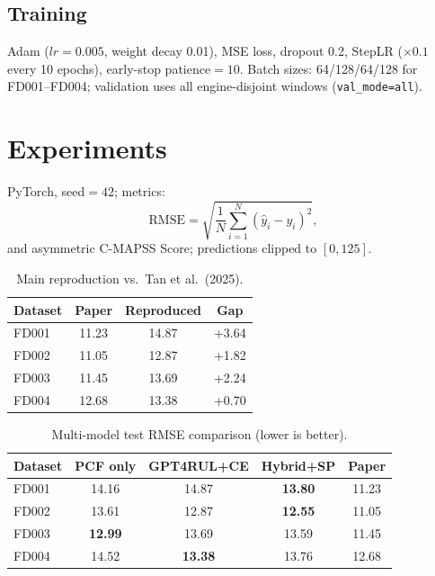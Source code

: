 \documentclass[10pt,twocolumn]{article}
\begin{document}
\subsection{Training}

Adam ($lr{=}0.005$, weight decay 0.01), MSE loss, dropout 0.2, StepLR ($\times 0.1$ every 10 epochs), early-stop patience${=}10$.
Batch sizes: 64/128/64/128 for FD001--FD004; validation uses all engine-disjoint windows (\texttt{val\_mode=all}).

\section{Experiments}

PyTorch, seed${=}42$; metrics:
\begin{equation}
  \mathrm{RMSE} = \sqrt{\frac{1}{N}\sum_{i=1}^{N}(\hat{y}_i - y_i)^2},
\end{equation}
and asymmetric C-MAPSS Score; predictions clipped to $[0,125]$.

\begin{table}[t]
  \centering
  \caption{Main reproduction vs.\ Tan et al.\ (2025).}
  \label{tab:main}
  \small
  \begin{tabular}{@{}lccc@{}}
    \toprule
    Dataset & Paper & Reproduced & Gap \\
    \midrule
    FD001 & 11.23 & 14.87 & +3.64 \\
    FD002 & 11.05 & 12.87 & +1.82 \\
    FD003 & 11.45 & 13.69 & +2.24 \\
    FD004 & 12.68 & 13.38 & +0.70 \\
    \bottomrule
  \end{tabular}
\end{table}

\begin{table}[t]
  \centering
  \caption{Multi-model test RMSE comparison (lower is better).}
  \label{tab:models}
  \scriptsize
  \begin{tabular}{@{}lcccc@{}}
    \toprule
    Dataset & PCF only & GPT4RUL+CE & Hybrid+SP & Paper \\
    \midrule
    FD001 & 14.16 & 14.87 & \textbf{13.80} & 11.23 \\
    FD002 & 13.61 & 12.87 & \textbf{12.55} & 11.05 \\
    FD003 & \textbf{12.99} & 13.69 & 13.59 & 11.45 \\
    FD004 & 14.52 & \textbf{13.38} & 13.76 & 12.68 \\
    \bottomrule
  \end{tabular}
\end{table}
\end{document}
